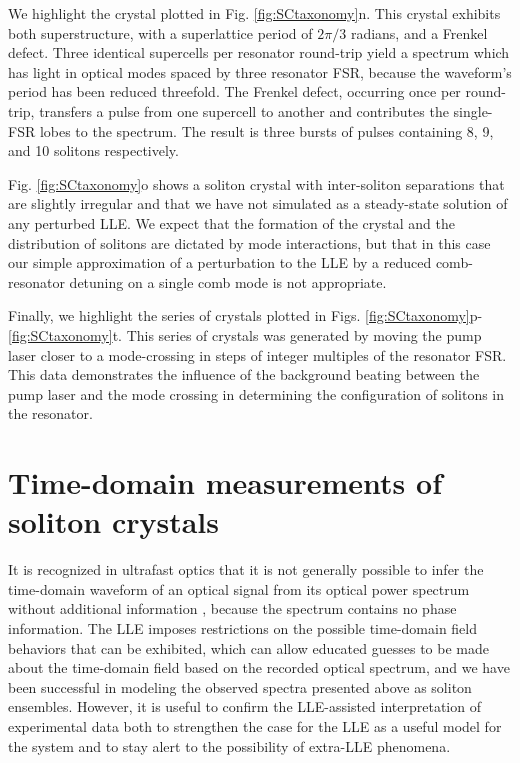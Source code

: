 We highlight the crystal plotted in Fig. \ref{fig:SCtaxonomy}n. This crystal exhibits both superstructure, with a superlattice period of $2\pi/3$ radians, and a Frenkel defect. Three identical supercells per resonator round-trip yield a spectrum which has light in optical modes spaced by three resonator FSR, because the waveform's period has been reduced threefold. The Frenkel defect, occurring once per round-trip, transfers a pulse from one supercell to another and contributes the single-FSR lobes to the spectrum. The result is three bursts of pulses containing 8, 9, and 10 solitons respectively. 	

Fig. \ref{fig:SCtaxonomy}o shows a soliton crystal with inter-soliton separations that are slightly irregular and that we have not simulated as a steady-state solution of any perturbed LLE. We expect that the formation of the crystal and the distribution of solitons are dictated by mode interactions, but that in this case our simple approximation of a perturbation to the LLE by a reduced comb-resonator detuning on a single comb mode is not appropriate.

Finally, we highlight the series of crystals plotted in Figs. \ref{fig:SCtaxonomy}p-\ref{fig:SCtaxonomy}t. This series of crystals was generated by moving the pump laser closer to a mode-crossing in steps of integer multiples of the resonator FSR. This data demonstrates the influence of the background beating between the pump laser and the mode crossing in determining the configuration of solitons in the resonator.




\section{Time-domain measurements of soliton crystals}
It is recognized in ultrafast optics that it is not generally possible to infer the time-domain waveform of an optical signal from its optical power spectrum without additional information \cite{Weiner2009}, because the spectrum contains no phase information. The LLE imposes restrictions on the possible time-domain field behaviors that can be exhibited, which can allow educated guesses to be made about the time-domain field based on the recorded optical spectrum, and we have been successful in modeling the observed spectra presented above as soliton ensembles. However, it is useful to confirm the LLE-assisted interpretation of experimental data both to strengthen the case for the LLE as a useful model for the system and to stay alert to the possibility of extra-LLE phenomena. 

